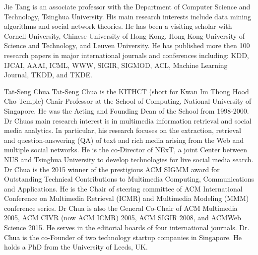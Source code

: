 \documentclass[10pt,journal,compsoc]{IEEEtran}
\begin{document}
\begin{IEEEbiography}
{Jie Tang} is an associate professor with the Department of Computer Science and Technology, Tsinghua University. His main research interests include data mining algorithms and social network theories. He has been a visiting scholar with Cornell University, Chinese University of Hong Kong, Hong Kong University of Science and Technology, and Leuven University. He has published more then 100 research papers in major international journals and conferences including: KDD, IJCAI, AAAI, ICML, WWW, SIGIR, SIGMOD, ACL, Machine Learning Journal, TKDD, and TKDE.
\end{IEEEbiography}
\begin{IEEEbiography}{Tat-Seng Chua}
Tat-Seng Chua is the KITHCT (short for Kwan Im Thong Hood Cho Temple) Chair Professor at the School of Computing, National University of Singapore. He was the Acting and Founding Dean of the School from 1998-2000. Dr Chuas
main research interest is in multimedia information
retrieval and social media analytics. In
particular, his research focuses on the extraction,
retrieval and question-answering (QA) of
text and rich media arising from the Web and
multiple social networks. He is the co-Director of
NExT, a joint Center between NUS and Tsinghua
University to develop technologies for live social media search. Dr Chua
is the 2015 winner of the prestigious ACM SIGMM award for Outstanding
Technical Contributions to Multimedia Computing, Communications and
Applications. He is the Chair of steering committee of ACM International
Conference on Multimedia Retrieval (ICMR) and Multimedia Modeling
(MMM) conference series. Dr Chua is also the General Co-Chair of
ACM Multimedia 2005, ACM CIVR (now ACM ICMR) 2005, ACM SIGIR
2008, and ACMWeb Science 2015. He serves in the editorial boards of
four international journals. Dr. Chua is the co-Founder of two technology
startup companies in Singapore. He holds a PhD from the University of
Leeds, UK.
\end{IEEEbiography} 
\end{document}
